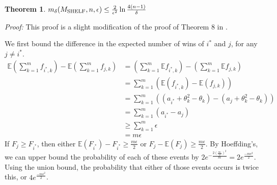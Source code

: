 \documentclass[letterpaper,12pt]{article}
\newcommand{\E}{\mathbb{E}}
\newcommand{\1}{\mathbbm{1}}
\newtheorem{theorem}{Theorem}
\begin{document}


\begin{theorem}
  \label{shelf_bound}
    $m_\delta(M_{\mathrm{SHELF}}, n, \epsilon) \leq \frac{2}{\epsilon^2} \ln \frac{4(n-1)}{\delta}$
\end{theorem}
\emph{Proof:} This proof is a slight modification of the proof of Theorem 8 in \cite{elf}.

We first bound the difference in the expected number of wins of $i^*$ and $j$, for any $j \neq i^*$. 
\begin{align*}
  \E \left( \sum_{k=1}^m f_{i^*, k}\right) - \E \left( \sum_{k=1}^m f_{j, k}\right)
  &= \left( \sum_{k=1}^m \E f_{i^*, k}\right) - \left( \sum_{k=1}^m \E f_{j, k}\right)\\
  &= \sum_{k=1}^m \left(\E (f_{i^*, k}) - \E (f_{j, k})\right)\\
  &= \sum_{k=1}^m \left((a_{i^*} + \theta_k^2 - \theta_k) - (a_j + \theta_k^2 - \theta_k)\right)\\
  &= \sum_{k=1}^m \left(a_{i^*} - a_j\right)\\
  &\geq \sum_{k=1}^m \epsilon\\
  &=m \epsilon
\end{align*}
If $F_j \geq F_{i^*}$, then either $\E(F_{i^*}) - F_{i^*} \geq \frac{m \epsilon}{2}$ or $F_j - \E(F_j) \geq \frac{m \epsilon}{2}$. By Hoeffding's, we can upper bound the probability of each of these events by $2 e^{-\frac{2 (\frac{m \epsilon}{2})^2}{m}} = 2 e^{\frac{- m \epsilon^2}{2}}$. Using the union bound, the probability that either of those events occurs is twice this, or $4 e^{\frac{- m \epsilon^2}{2}}$.
\end{document}
